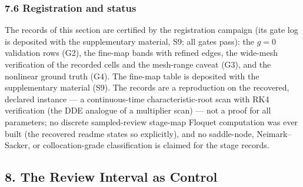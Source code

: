 \documentclass[11pt]{article}
\begin{document}
\subsubsection{7.6 Registration and
status}\label{registration-and-status}

The records of this section are certified by the registration campaign
(its gate log is deposited with the supplementary material, S9; all
gates pass): the \(g = 0\) validation rows (G2), the fine-map bands with
refined edges, the wide-mesh verification of the recorded cells and the
mesh-range caveat (G3), and the nonlinear ground truth (G4). The
fine-map table is deposited with the supplementary material (S9). The
records are a reproduction on the recovered, declared instance --- a
continuous-time characteristic-root scan with RK4 verification (the DDE
analogue of a multiplier scan) --- not a proof for all parameters; no
discrete sampled-review stage-map Floquet computation was ever built
(the recovered readme states so explicitly), and no saddle-node,
Neimark--Sacker, or collocation-grade classification is claimed for the
stage records.

\subsection{8. The Review Interval as
Control}\label{the-review-interval-as-control}
\end{document}
